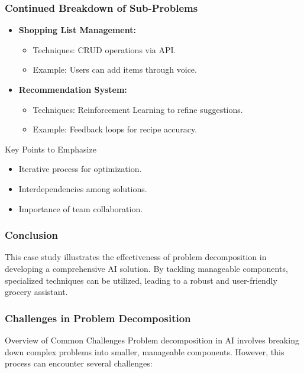 \documentclass[aspectratio=169]{beamer}
\begin{document}
\begin{frame}[fragile]
    \frametitle{Continued Breakdown of Sub-Problems}
    \begin{itemize}
        \item \textbf{Shopping List Management:}
        \begin{itemize}
            \item Techniques: CRUD operations via API.
            \item Example: Users can add items through voice.
        \end{itemize}
        
        \item \textbf{Recommendation System:}
        \begin{itemize}
            \item Techniques: Reinforcement Learning to refine suggestions.
            \item Example: Feedback loops for recipe accuracy.
        \end{itemize}
    \end{itemize}
    
    \begin{block}{Key Points to Emphasize}
        \begin{itemize}
            \item Iterative process for optimization.
            \item Interdependencies among solutions.
            \item Importance of team collaboration.
        \end{itemize}
    \end{block}
\end{frame}

\begin{frame}[fragile]
    \frametitle{Conclusion}
    This case study illustrates the effectiveness of problem decomposition in developing a comprehensive AI solution. By tackling manageable components, specialized techniques can be utilized, leading to a robust and user-friendly grocery assistant.
\end{frame}

\begin{frame}[fragile]
    \frametitle{Challenges in Problem Decomposition}
    \begin{block}{Overview of Common Challenges}
        Problem decomposition in AI involves breaking down complex problems into smaller, manageable components. However, this process can encounter several challenges:
    \end{block}
\end{frame}
\end{document}
